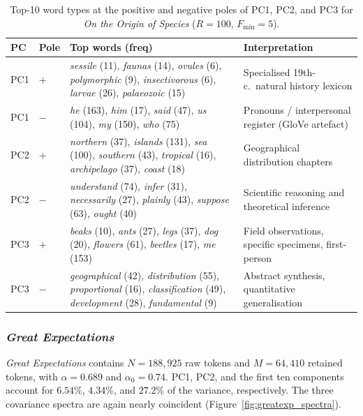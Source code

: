 \documentclass[12pt,a4paper]{article}
\begin{document}
\begin{table}[htbp]
\centering
\caption{Top-10 word types at the positive and negative poles
of PC1, PC2, and PC3 for \emph{On the Origin of Species}
($R=100$, $F_{\min}=5$).}
\label{tab:darwin_pc}
\small
\setlength{\tabcolsep}{4pt}
\begin{tabular}{ll p{6cm} p{5.5cm}}
\toprule
PC & Pole & Top words (freq) & Interpretation \\
\midrule
PC1 & $+$ &
  \emph{sessile} (11), \emph{faunas} (14), \emph{ovules} (6),
  \emph{polymorphic} (9), \emph{insectivorous} (6),
  \emph{larvae} (26), \emph{palaeozoic} (15)
  & Specialised 19th-c.\ natural history lexicon \\
PC1 & $-$ &
  \emph{he} (163), \emph{him} (17), \emph{said} (47),
  \emph{us} (104), \emph{my} (150), \emph{who} (75)
  & Pronouns / interpersonal register (GloVe artefact) \\
\midrule
PC2 & $+$ &
  \emph{northern} (37), \emph{islands} (131), \emph{sea} (100),
  \emph{southern} (43), \emph{tropical} (16),
  \emph{archipelago} (37), \emph{coast} (18)
  & Geographical distribution chapters \\
PC2 & $-$ &
  \emph{understand} (74), \emph{infer} (31),
  \emph{necessarily} (27), \emph{plainly} (43),
  \emph{suppose} (63), \emph{ought} (40)
  & Scientific reasoning and theoretical inference \\
\midrule
PC3 & $+$ &
  \emph{beaks} (10), \emph{ants} (27), \emph{legs} (37),
  \emph{dog} (20), \emph{flowers} (61),
  \emph{beetles} (17), \emph{me} (153)
  & Field observations, specific specimens, first-person \\
PC3 & $-$ &
  \emph{geographical} (42), \emph{distribution} (55),
  \emph{proportional} (16), \emph{classification} (49),
  \emph{development} (28), \emph{fundamental} (9)
  & Abstract synthesis, quantitative generalisation \\
\bottomrule
\end{tabular}
\end{table}

\subsubsection{\emph{Great Expectations}}
\label{sec:greatexp}

\emph{Great Expectations} contains $N=188{,}925$ raw tokens and
$M=64{,}410$ retained tokens, with $\alpha=0.689$ and
$\alpha_0=0.74$. PC1, PC2, and the first ten components account for
$6.54\%$, $4.34\%$, and $27.2\%$ of the variance, respectively. The
three covariance spectra are again nearly coincident
(Figure~\ref{fig:greatexp_spectra}).
\end{document}
